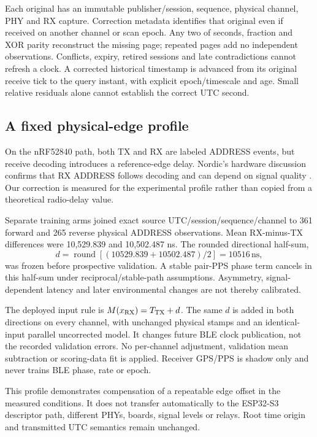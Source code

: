 \documentclass[11pt,letterpaper]{article}
\newcommand{\ns}{\,\mathrm{ns}}
\newcommand{\page}{\clearpage}
\begin{document}
Each original has an immutable publisher/session, sequence, physical channel, PHY and RX capture. Correction metadata identifies that original even if received on another channel or scan epoch. Any two of seconds, fraction and XOR parity reconstruct the missing page; repeated pages add no independent observations. Conflicts, expiry, retired sessions and late contradictions cannot refresh a clock. A corrected historical timestamp is advanced from its original receive tick to the query instant, with explicit epoch/timescale and age. Small relative residuals alone cannot establish the correct UTC second.

\subsection{A fixed physical-edge profile}
On the nRF52840 path, both TX and RX are labeled ADDRESS events, but receive decoding introduces a reference-edge delay. Nordic's hardware discussion confirms that RX ADDRESS follows decoding and can depend on signal quality \cite{edge}. Our correction is measured for the experimental profile rather than copied from a theoretical radio-delay value.

Separate training arms joined exact source UTC/session/sequence/channel to 361 forward and 265 reverse physical ADDRESS observations. Mean RX-minus-TX differences were 10,529.839 and 10,502.487 ns. The rounded directional half-sum,
\begin{equation}
 d=\operatorname{round}\!\left[(10529.839+10502.487)/2\right]=10516\ns,
\end{equation}
was frozen before prospective validation. A stable pair-PPS phase term cancels in this half-sum under reciprocal/stable-path assumptions. Asymmetry, signal-dependent latency and later environmental changes are not thereby calibrated.

The deployed input rule is $M(x_{\rm RX})=T_{\rm TX}+d$. The same $d$ is added in both directions on every channel, with unchanged physical stamps and an identical-input parallel uncorrected model. It changes future BLE clock publication, not the recorded validation errors. No per-channel adjustment, validation mean subtraction or scoring-data fit is applied. Receiver GPS/PPS is shadow only and never trains BLE phase, rate or epoch.

This profile demonstrates compensation of a repeatable edge offset in the measured conditions. It does not transfer automatically to the ESP32-S3 descriptor path, different PHYs, boards, signal levels or relays. Root time origin and transmitted UTC semantics remain unchanged.
\page
\end{document}
